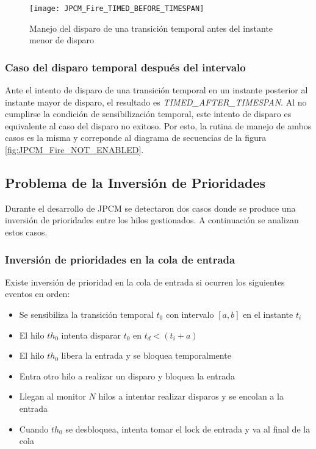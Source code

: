 \begin{figure}[H]
  \centering
  \texttt{[image: JPCM\_Fire\_TIMED\_BEFORE\_TIMESPAN]}
  \caption{Manejo del disparo de una transición temporal antes del instante
  menor de disparo}
  \label{fig:JPCM_Fire_TIMED_BEFORE_TIMESPAN}
\end{figure}

\subsubsection*{Caso del disparo temporal después del intervalo}

Ante el intento de disparo de una transición temporal en un instante posterior
al instante mayor de disparo, el resultado es \textit{TIMED\_AFTER\_TIMESPAN}.
Al no cumplirse la condición de sensibilización temporal, este intento de
disparo es equivalente al caso del disparo no exitoso. Por esto, la rutina de
manejo de ambos casos es la misma y correponde al diagrama de secuencias de la
figura \ref{fig:JPCM_Fire_NOT_ENABLED}.

\subsection{Problema de la Inversión de Prioridades}
\label{sec:inversion_prioridad}
Durante el desarrollo de JPCM se detectaron dos casos donde se produce una
inversión de prioridades entre los hilos gestionados. A continuación se
analizan estos casos.

\subsubsection{Inversión de prioridades en la cola de entrada}
\label{inversion_prioridad_cola_entrada}
Existe inversión de prioridad en la cola de entrada si ocurren los siguientes
eventos en orden:
\begin{itemize}
  \item Se sensibiliza la transición temporal $t_{0}$ con intervalo $[a,b]$ en
  el instante $t_{i}$
  \item El hilo $th_{0}$ intenta disparar $t_{0}$ en $t_{d} < (t_{i} + a)$
  \item El hilo $th_{0}$ libera la entrada y se bloquea temporalmente
  \item Entra otro hilo a realizar un disparo y bloquea la entrada
  \item Llegan al monitor $N$ hilos a intentar realizar disparos y se encolan a
  la entrada
  \item Cuando $th_{0}$ se desbloquea, intenta tomar el lock de entrada y va al
  final de la cola
\end{itemize}

